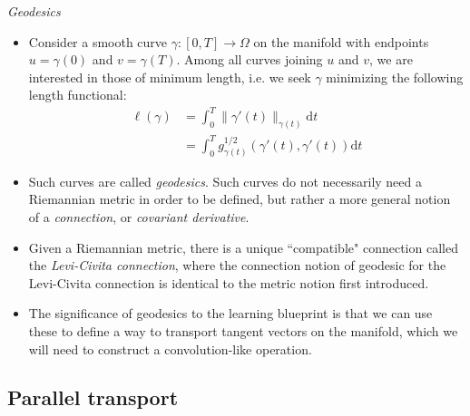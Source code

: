 \documentclass[12pt]{article}
\numberwithin{equation}{section}
\theoremstyle{definition}
\newcommand{		\rd		}	{	\textrm{d}					}
\newcommand{		\n		}	{	\noindent					} %
\newcommand{		\1		}	{	\bm{1}					}%
\begin{document}
\n\hrulefill 
\emph{ Geodesics }
\hrulefill

\begin{itemize}

\item Consider a smooth curve $\gamma : [0,T] \to \Omega$ on the manifold with endpoints $u = \gamma(0)$ and $v = \gamma(T)$. Among all curves joining $u$ and $v$, we are interested in those of minimum length, i.e. we seek $\gamma$ minimizing the following length functional:
\begin{align*}
\ell(\gamma) &= \int_0^T \| \gamma'(t) \|_{\gamma(t)} \rd t \\
&= \int_0^T g_{\gamma(t)}^{1/2} ( \gamma'(t), \gamma'(t)) \rd t 
\end{align*}
\item Such curves are called \emph{geodesics}. Such curves do not necessarily need a Riemannian metric in order to be defined, but rather a more general notion of a \emph{connection}, or \emph{covariant derivative}. 
\item Given a Riemannian metric, there is a unique ``compatible" connection called the \emph{Levi-Civita connection}, where the connection notion of geodesic for the Levi-Civita connection is identical to the metric notion first introduced.
\item The significance of geodesics to the learning blueprint is that we can use these to define a way to transport tangent vectors on the manifold, which we will need to construct a convolution-like operation. 
\end{itemize}

\subsection{Parallel transport}
\hrulefill
\end{document}
